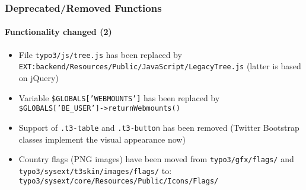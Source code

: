 \begin{frame}[fragile]
	\frametitle{Deprecated/Removed Functions}
	\framesubtitle{Functionality changed (2)}

	\begin{itemize}

		\item File
			\small\texttt{typo3/js/tree.js}\normalsize\space
			has been replaced by
			\small\texttt{EXT:backend/Resources/Public/JavaScript/LegacyTree.js}\normalsize\newline
			(latter is based on jQuery)

		\item Variable
			\small\texttt{\$GLOBALS['WEBMOUNTS']}\normalsize\space
			has been replaced by
			\small\texttt{\$GLOBALS['BE\_USER']->returnWebmounts()}\normalsize

		\item Support of
			\small\texttt{.t3-table}\normalsize\space
			and
			\small\texttt{.t3-button}\normalsize\space
			has been removed\newline
			\small
				(Twitter Bootstrap classes implement the visual appearance now)
			\normalsize

		\item Country flags (PNG images) have been moved from
			\small\texttt{typo3/gfx/flags/}\normalsize
			and
			\small\texttt{typo3/sysext/t3skin/images/flags/}\normalsize\newline
			to: \small\texttt{typo3/sysext/core/Resources/Public/Icons/Flags/}\normalsize

	\end{itemize}

\end{frame}


